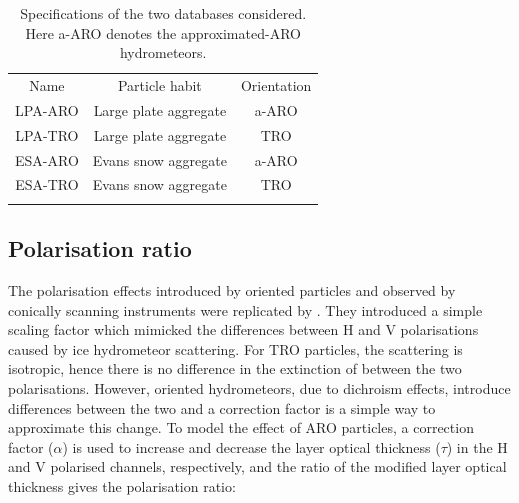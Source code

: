 \documentclass[amt, manuscript]{copernicus}
\begin{document}


 
\begin{table}[t]
	\caption{Specifications of the two databases considered. Here a-ARO denotes the approximated-ARO hydrometeors.}
	\label{tab:database_configuration}	
	\begin{tabular}{ccc}
		\tophline
		Name & Particle habit 	& Orientation  \\
		\middlehline
		LPA-ARO & Large plate aggregate & a-ARO\\
		LPA-TRO & Large plate aggregate & TRO\\
		ESA-ARO & Evans snow aggregate  & a-ARO\\
		ESA-TRO & Evans snow aggregate & TRO\\
		\bottomhline
	\end{tabular}
	\belowtable{} %
\end{table}




\subsection{Polarisation ratio}
\label{sec:polratio}

The polarisation effects introduced by oriented particles and observed by conically scanning instruments \citep{gong:micro:17} were replicated by \citet{barlakas:intro:21}. They introduced a simple scaling factor which mimicked the differences between H and V polarisations caused by ice hydrometeor scattering. For TRO particles, the scattering is isotropic, hence there is no difference in the extinction of between the two polarisations. However, oriented hydrometeors, due to dichroism effects, introduce differences between the two and a correction factor is a simple way to approximate this change. To model the effect of ARO particles, a correction factor ($\alpha$) is used to increase and decrease the layer optical thickness ($\tau$) in the H and V
polarised channels, respectively, and the ratio of the modified layer optical thickness gives the polarisation ratio:
\end{document}
